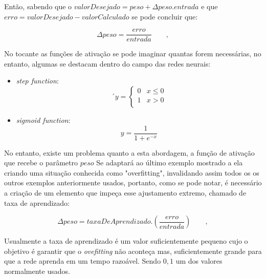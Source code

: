\begin{apendicesenv}
		\par Então, sabendo que o $valorDesejado = peso + \Delta peso . entrada$ e que $erro = valorDesejado - valorCalculado$ se pode concluir que:
		
		\begin{equation}
			\Delta peso = \dfrac{erro} { entrada} \qquad,
		\end{equation}
	
		\par No tocante as funções de ativação se pode imaginar quantas forem necessárias, no entanto, algumas se destacam dentro do campo das redes neurais:
	
		\begin{itemize}
			\item \textit{step function}: \begin{equation}
´				y = \begin{cases} 
					0 & x\leq 0 \\
					1 & x > 0 \\
				\end{cases}
			\end{equation}
			\item \textit{sigmoid function}: \begin{equation}
				y = \dfrac{1}{1 + e^{-x}}
			\end{equation}
		\end{itemize}
	
		\par No entanto, existe um problema quanto a esta abordagem, a função de ativação que recebe o parâmetro $peso$ Se adaptará ao último exemplo mostrado a ela criando uma situação conhecida como "overfitting", invalidando assim todos os os outros exemplos anteriormente usados, portanto, como se pode notar, é necessário a criação de um elemento que impeça esse ajustamento extremo, chamado de taxa de aprendizado:
		
		\begin{equation}
			\Delta peso = taxaDeAprendizado . \left( \dfrac{erro} { entrada} \right) \qquad,
		\end{equation}
			
		\par Usualmente a taxa de aprendizado é um valor suficientemente pequeno cujo o objetivo é garantir que o \textit{ovefitting} não aconteça mas, suficientemente grande para que a rede aprenda em um tempo razoável. Sendo $0,1$ um dos valores normalmente usados.
		

\end{apendicesenv}
